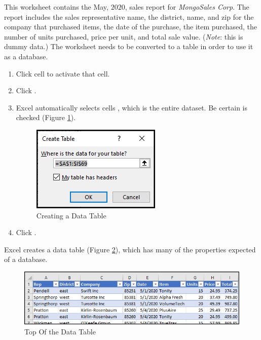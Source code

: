 This worksheet contains the May, $ 2020 $, sales report for \textit{MongoSales Corp}. The report includes the sales representative name, the district, name, and zip for the company that purchased items, the date of the purchase, the item purchased, the number of units purchased, price per unit, and total sale value. (\textit{Note}: this is dummy data.) The worksheet needs to be converted to a table in order to use it as a database.

\begin{enumerate}[resume]
	\item Click cell  to activate that cell.
	\item Click .
	\item Excel automatically selects cells , which is the entire dataset. Be certain  is checked (Figure \ref{09:fig10}).

	\begin{figure}[H]
		\centering
		\includegraphics[width=\maxwidth{.95\linewidth}]{gfx/ch09_fig10}
		\caption{Creating a Data Table}
		\label{09:fig10}
	\end{figure}
	
	\item Click .
\end{enumerate}

Excel creates a data table (Figure \ref{09:fig11}), which has many of the properties expected of a database. 

\begin{figure}[H]
	\centering
	\includegraphics[width=\maxwidth{.95\linewidth}]{gfx/ch09_fig11}
	\caption{Top Of the Data Table}
	\label{09:fig11}
\end{figure}

